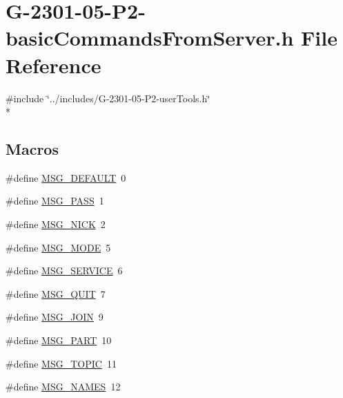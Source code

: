 \hypertarget{_g-2301-05-_p2-basic_commands_from_server_8h}{\section{G-\/2301-\/05-\/\-P2-\/basic\-Commands\-From\-Server.h File Reference}
\label{_g-2301-05-_p2-basic_commands_from_server_8h}
}
{\ttfamily \#include \char`\"{}../includes/\-G-\/2301-\/05-\/\-P2-\/user\-Tools.\-h\char`\"{}}\\*
\subsection*{Macros}
\begin{DoxyCompactItemize}
\item 
\#define \hyperlink{_g-2301-05-_p2-basic_commands_from_server_8h_ab68ac40eace3f4d79f5354453773c583}{M\-S\-G\-\_\-\-D\-E\-F\-A\-U\-L\-T}~0
\item 
\#define \hyperlink{_g-2301-05-_p2-basic_commands_from_server_8h_ac932c0071ffab6330f621400e10a80ec}{M\-S\-G\-\_\-\-P\-A\-S\-S}~1
\item 
\#define \hyperlink{_g-2301-05-_p2-basic_commands_from_server_8h_ace2a2cde4cc9515d035aae9167158356}{M\-S\-G\-\_\-\-N\-I\-C\-K}~2
\item 
\#define \hyperlink{_g-2301-05-_p2-basic_commands_from_server_8h_a9fd0f43f293031d18a7b06276db6d664}{M\-S\-G\-\_\-\-M\-O\-D\-E}~5
\item 
\#define \hyperlink{_g-2301-05-_p2-basic_commands_from_server_8h_a33c33bfecad983d967ebd9e9a7935f88}{M\-S\-G\-\_\-\-S\-E\-R\-V\-I\-C\-E}~6
\item 
\#define \hyperlink{_g-2301-05-_p2-basic_commands_from_server_8h_ac8273a5a7d3c4a158db1130c30e61958}{M\-S\-G\-\_\-\-Q\-U\-I\-T}~7
\item 
\#define \hyperlink{_g-2301-05-_p2-basic_commands_from_server_8h_a524e3778261581851bbf385356b16ad5}{M\-S\-G\-\_\-\-J\-O\-I\-N}~9
\item 
\#define \hyperlink{_g-2301-05-_p2-basic_commands_from_server_8h_ad1fd0ad922d78d93e43488a0ad403cbd}{M\-S\-G\-\_\-\-P\-A\-R\-T}~10
\item 
\#define \hyperlink{_g-2301-05-_p2-basic_commands_from_server_8h_a39ddc5879d91229533bb1d6c95d4c693}{M\-S\-G\-\_\-\-T\-O\-P\-I\-C}~11
\item 
\#define \hyperlink{_g-2301-05-_p2-basic_commands_from_server_8h_abe6497a57f23834ebda49482f49295dd}{M\-S\-G\-\_\-\-N\-A\-M\-E\-S}~12

\end{DoxyCompactItemize}
